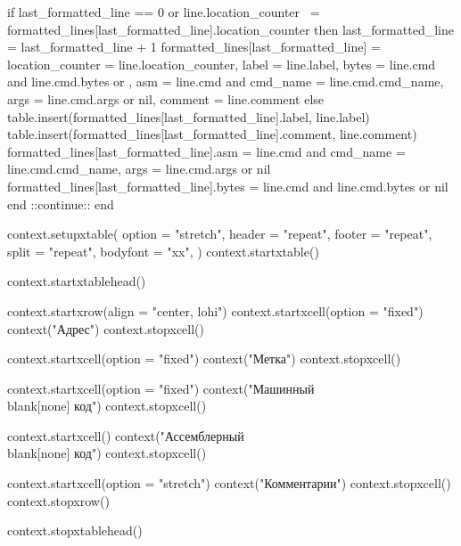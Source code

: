         if last_formatted_line == 0 or line.location_counter ~= formatted_lines[last_formatted_line].location_counter then
            last_formatted_line = last_formatted_line + 1
            formatted_lines[last_formatted_line] = {
                location_counter = line.location_counter,
                label = {line.label},
                bytes = line.cmd and line.cmd.bytes or {},
                asm = line.cmd and {cmd_name = line.cmd.cmd_name, args = line.cmd.args} or nil,
                comment = {line.comment}
            }
        else
            table.insert(formatted_lines[last_formatted_line].label, line.label)
            table.insert(formatted_lines[last_formatted_line].comment, line.comment)
            formatted_lines[last_formatted_line].asm = line.cmd and {cmd_name = line.cmd.cmd_name, args = line.cmd.args} or nil
            formatted_lines[last_formatted_line].bytes = line.cmd and line.cmd.bytes or nil
        end
        ::continue::
    end

    context.setupxtable({
        option = "stretch",
        header = "repeat",
        footer = "repeat",
        split  = "repeat",
        bodyfont = "xx",
    })
    context.startxtable()

    context.startxtablehead()

    context.startxrow({align = "center, lohi"})
        context.startxcell({option = "fixed"})
            context("Адрес")
        context.stopxcell()

        context.startxcell({option = "fixed"})
            context("Метка")
        context.stopxcell()

        context.startxcell({option = "fixed"})
            context("Машинный\\blank[none] код")
        context.stopxcell()

        context.startxcell()
            context("Ассемблерный\\blank[none] код")
        context.stopxcell()

        context.startxcell({option = "stretch"})
            context("Комментарии")
        context.stopxcell()
    context.stopxrow()

    context.stopxtablehead()

